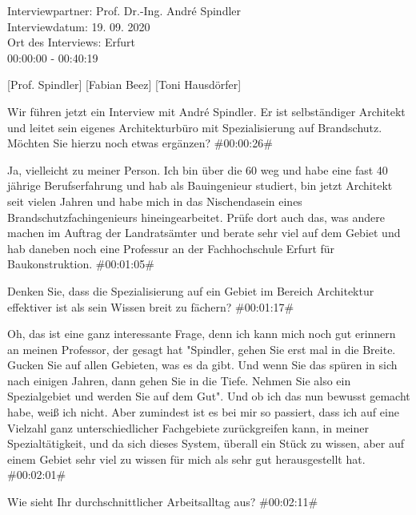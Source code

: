Interviewpartner: \hfill Prof. Dr.-Ing. André Spindler\\
Interviewdatum: \hfill 19. 09. 2020\\
Ort des Interviews: \hfill Erfurt\\
\vspace{0.4cm}
00:00:00 - 00:40:19\\
\vspace{0.4cm}

\footnotesize
{}[Prof. Spindler]
[Fabian Beez]
[Toni Hausdörfer]
\addtolength{\transcriptlen}{1em}

\begin{description}

\Fabian Wir führen jetzt ein Interview mit André Spindler. Er ist selbständiger Architekt und leitet sein eigenes Architekturbüro mit Spezialisierung auf Brandschutz. Möchten Sie hierzu noch etwas ergänzen? \#00:00:26\#

\Andre Ja, vielleicht zu meiner Person. Ich bin über die 60 weg und habe eine fast 40 jährige Berufserfahrung und hab als Bauingenieur studiert, bin jetzt Architekt seit vielen Jahren und habe mich in das Nischendasein eines Brandschutzfachingenieurs hineingearbeitet. Prüfe dort auch das, was andere machen im Auftrag der Landratsämter und berate sehr viel auf dem Gebiet und hab daneben noch eine Professur an der Fachhochschule Erfurt für Baukonstruktion. \#00:01:05\#

\Fabian Denken Sie, dass die Spezialisierung auf ein Gebiet im Bereich Architektur effektiver ist als sein Wissen breit zu fächern? \#00:01:17\#

\Andre Oh, das ist eine ganz interessante Frage, denn ich kann mich noch gut erinnern an meinen Professor, der gesagt hat "Spindler, gehen Sie erst mal in die Breite. Gucken Sie auf allen Gebieten, was es da gibt. Und wenn Sie das spüren in sich nach einigen Jahren, dann gehen Sie in die Tiefe. Nehmen Sie also ein Spezialgebiet und werden Sie auf dem Gut". Und ob ich das nun bewusst gemacht habe, weiß ich nicht. Aber zumindest ist es bei mir so passiert, dass ich auf eine Vielzahl ganz unterschiedlicher Fachgebiete zurückgreifen kann, in meiner Spezialtätigkeit, und da sich dieses System, überall ein Stück zu wissen, aber auf einem Gebiet sehr viel zu wissen für mich als sehr gut herausgestellt hat. \#00:02:01\#

\Fabian Wie sieht Ihr durchschnittlicher Arbeitsalltag aus? \#00:02:11\#


\end{description}
